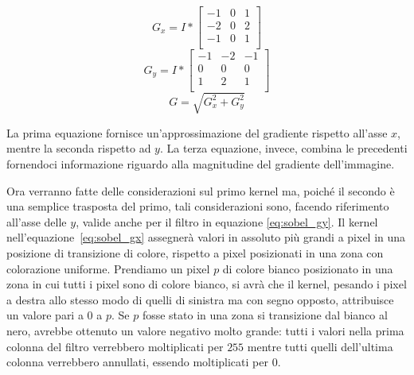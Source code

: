 \begin{equation} \label{eq:sobel_gx}
  G_x = 
  I
  *
  \begin{bmatrix}
    -1&0&1\\
    -2&0&2\\
    -1&0&1\\
  \end{bmatrix}
\end{equation}
\begin{equation} \label{eq:sobel_gy}
  G_y = 
  I
  *
  \begin{bmatrix}
    -1&-2&-1\\
    0&0&0\\
    1&2&1\\
  \end{bmatrix}
\end{equation}
\begin{equation} \label{eq:sobel_g}
  G = \sqrt{G_x^2 + G_y^2}
\end{equation}

La prima equazione fornisce un'approssimazione del gradiente rispetto all'asse $x$, mentre la seconda rispetto ad $y$.
La terza equazione, invece, combina le precedenti fornendoci informazione riguardo alla magnitudine del gradiente dell'immagine.


Ora verranno fatte delle considerazioni sul primo kernel ma, poiché il secondo è una semplice trasposta del primo, tali considerazioni sono, facendo riferimento all'asse delle $y$, valide anche per il filtro in equazione \ref{eq:sobel_gy}.
Il kernel nell'equazione~\ref{eq:sobel_gx} assegnerà valori in assoluto più grandi a pixel in una posizione di transizione di colore, rispetto a pixel posizionati in una zona con colorazione uniforme.
Prendiamo un pixel $p$ di colore bianco posizionato in una zona in cui tutti i pixel sono di colore bianco, si avrà che il kernel, pesando i pixel a destra allo stesso modo di quelli di sinistra ma con segno opposto, attribuisce un valore pari a $0$ a $p$.
Se $p$ fosse stato in una zona si transizione dal bianco al nero, avrebbe ottenuto un valore negativo molto grande:
tutti i valori nella prima colonna del filtro verrebbero moltiplicati per $255$ mentre tutti quelli dell'ultima colonna verrebbero annullati, essendo moltiplicati per $0$.


